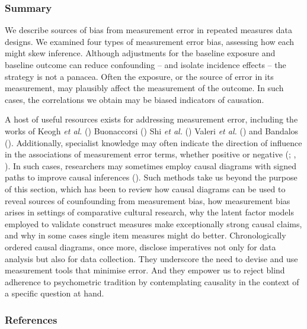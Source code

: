 \documentclass[
  singlecolumn,
  9pt]{article}
\begin{document}
\subsubsection{Summary}\label{summary}

We describe sources of bias from measurement error in repeated measures
data designs. We examined four types of measurement error bias,
assessing how each might skew inference. Although adjustments for the
baseline exposure and baseline outcome can reduce confounding -- and
isolate incidence effects -- the strategy is not a panacea. Often the
exposure, or the source of error in its measurement, may plausibly
affect the measurement of the outcome. In such cases, the correlations
we obtain may be biased indicators of causation.

A host of useful resources exists for addressing measurement error,
including the works of Keogh \emph{et al.}
() Buonaccorsi
() Shi \emph{et al.}
() Valeri \emph{et al.}
() and Bandalos
(). Additionally, specialist knowledge
may often indicate the direction of influence in the associations of
measurement error terms, whether positive or negative
(;
,
). In such cases, researchers may
sometimes employ causal diagrams with signed paths to improve causal
inferences (). Such methods take us beyond the purpose of this section, which
has been to review how causal diagrams can be used to reveal sources of
counfounding from measurement bias, how measurement bias arises in
settings of comparative cultural research, why the latent factor models
employed to validate construct measures make exceptionally strong causal
claims, and why in some cases single item measures might do better.
Chronologically ordered causal diagrams, once more, disclose imperatives
not only for data analysis but also for data collection. They underscore
the need to devise and use measurement tools that minimise error. And
they empower us to reject blind adherence to psychometric tradition by
contemplating causality in the context of a specific question at hand.

\subsubsection*{References}\label{references}
\end{document}
